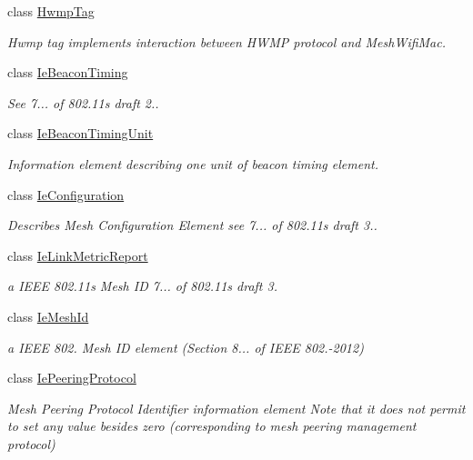 \begin{DoxyCompactItemize}
class \hyperlink{classns3_1_1dot11s_1_1HwmpTag}{Hwmp\+Tag}
\begin{DoxyCompactList}\small\item\em Hwmp tag implements interaction between H\+W\+MP protocol and Mesh\+Wifi\+Mac. \end{DoxyCompactList}\item 
class \hyperlink{classns3_1_1dot11s_1_1IeBeaconTiming}{Ie\+Beacon\+Timing}
\begin{DoxyCompactList}\small\item\em See 7... of 802.\+11s draft 2.. \end{DoxyCompactList}\item 
class \hyperlink{classns3_1_1dot11s_1_1IeBeaconTimingUnit}{Ie\+Beacon\+Timing\+Unit}
\begin{DoxyCompactList}\small\item\em Information element describing one unit of beacon timing element. \end{DoxyCompactList}\item 
class \hyperlink{classns3_1_1dot11s_1_1IeConfiguration}{Ie\+Configuration}
\begin{DoxyCompactList}\small\item\em Describes Mesh Configuration Element see 7... of 802.\+11s draft 3.. \end{DoxyCompactList}\item 
class \hyperlink{classns3_1_1dot11s_1_1IeLinkMetricReport}{Ie\+Link\+Metric\+Report}
\begin{DoxyCompactList}\small\item\em a I\+E\+EE 802.\+11s Mesh ID 7... of 802.\+11s draft 3. \end{DoxyCompactList}\item 
class \hyperlink{classns3_1_1dot11s_1_1IeMeshId}{Ie\+Mesh\+Id}
\begin{DoxyCompactList}\small\item\em a I\+E\+EE 802. Mesh ID element (Section 8... of I\+E\+EE 802.-\/2012) \end{DoxyCompactList}\item 
class \hyperlink{classns3_1_1dot11s_1_1IePeeringProtocol}{Ie\+Peering\+Protocol}
\begin{DoxyCompactList}\small\item\em Mesh Peering Protocol Identifier information element Note that it does not permit to set any value besides zero (corresponding to mesh peering management protocol) \end{DoxyCompactList}\item 

\end{DoxyCompactItemize}
